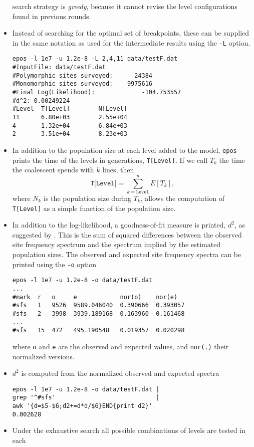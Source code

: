 \documentclass[a4paper, english]{article}
\newcommand{\ty}{\texttt}
\begin{document}
\begin{itemize}
search strategy is \emph{greedy}, because it cannot revise the level
configurations found in previous rounds.
\item Instead of searching for the optimal set of breakpoints, these
  can be supplied in the same notation as used for the intermediate
  results using the \texttt{-L} option.
\begin{verbatim}
epos -l 1e7 -u 1.2e-8 -L 2,4,11 data/testF.dat 
#InputFile: data/testF.dat
#Polymorphic sites surveyed:      24384
#Monomorphic sites surveyed:    9975616
#Final Log(Likelihood):             -104.753557
#d^2: 0.00249224
#Level  T[Level]        N[Level]
11      6.80e+03        2.55e+04
4       1.32e+04        6.84e+03
2       3.51e+04        8.23e+03
\end{verbatim}
\item In addition to the population size at each level added to the model, \ty{epos}
  prints the time of the levels in generations, \ty{T[Level]}. If we call $T_k$ the
  time the coalescent spends with $k$ lines, then
  \[
  \ty{T[Level]} = \sum_{k=\ty{Level}}^n E[T_k],
    \]
  where $N_k$ is the population size during $T_k$,
  allows the computation of \ty{T[Level]} as a simple function of the
  population size.
\item In addition to the log-likelihood, a goodness-of-fit measure is
  printed, $d^2$, as suggested by \cite{lap17:acc}. This is the sum of
  squared differences between the observed site frequency spectrum and
  the spectrum implied by the estimated population sizes. The observed
  and expected site frequency spectra can be printed using the \ty{-o}
  option
\begin{verbatim}
epos -l 1e7 -u 1.2e-8 -o data/testF.dat 
...
#mark  r   o     e            nor(o)    nor(e)
#sfs   1   9526  9589.046040  0.390666  0.393057
#sfs   2   3998  3939.189168  0.163960  0.161468
...
#sfs   15  472   495.190548   0.019357  0.020298
\end{verbatim}
where \ty{o} and \ty{e} are the observed and expected values, and
\ty{nor(.)} their normalized versions.
\item $d^2$ is computed from the normalized observed and expected
  spectra
\begin{verbatim}
epos -l 1e7 -u 1.2e-8 -o data/testF.dat | 
grep '^#sfs'                            | 
awk '{d=$5-$6;d2+=d*d/$6}END{print d2}'
0.002628
\end{verbatim}
\item Under the exhaustive search all possible combinations of levels are tested in each

\end{itemize}
\end{document}
